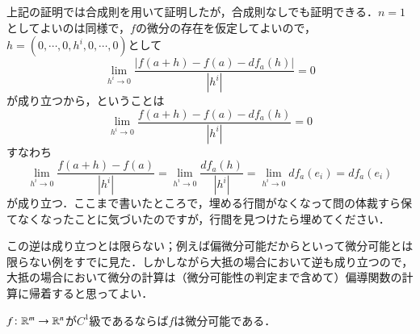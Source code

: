 \begin{que}
上記の証明では合成則を用いて証明したが，合成則なしでも証明できる．$n=1$としてよいのは同様で，$f$の微分の存在を仮定してよいので，$h = (0, \cdots,0, h^i, 0, \cdots, 0)$として
\begin{equation}
\lim_{h^i \to 0} \frac{\left| f(a+h) - f(a) -df_a(h) \right|}{\left|h^i\right|} = 0
\end{equation}が成り立つから，ということは
\begin{equation}
\lim_{h^i \to 0} \frac{f(a+h) - f(a) -df_a(h)}{\left|h^i\right|} = 0
\end{equation}すなわち
\begin{equation}
\lim_{h^i \to 0} \frac{f(a+h) - f(a)}{\left|h^i\right|} =  \lim_{h^i \to 0} \frac{df_a(h)}{\left|h^i\right|} = \lim_{h^i \to 0} df_a(e_i) = df_a(e_i)
\end{equation}が成り立つ．ここまで書いたところで，埋める行間がなくなって問の体裁すら保てなくなったことに気づいたのですが，行間を見つけたら埋めてください．
\end{que}

この逆は成り立つとは限らない；例えば偏微分可能だからといって微分可能とは限らない例をすでに見た．しかしながら大抵の場合において逆も成り立つので，大抵の場合において微分の計算は（微分可能性の判定まで含めて）偏導関数の計算に帰着すると思ってよい．

\begin{thm}\label{C1なら微分可能}
$f \colon \mathbb{R}^m \to \mathbb{R}^n$が$C^1$級であるならば$f$は微分可能である．
\end{thm}

